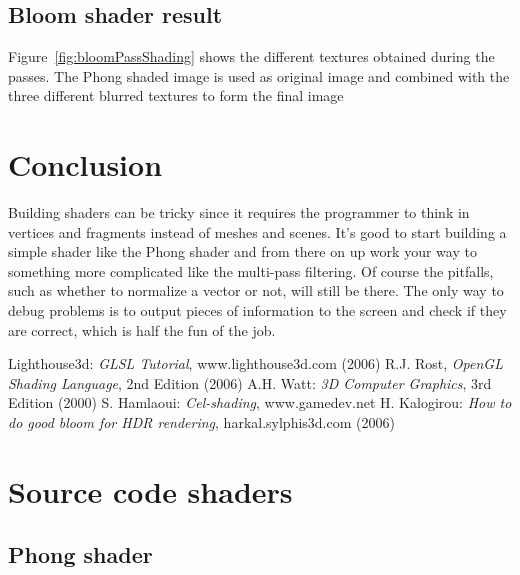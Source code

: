 \documentclass[a4paper,12pt]{article}
\begin{document}
\subsection{Bloom shader result}
\label{sec:bloomShaderResult}
Figure~\ref{fig:bloomPassShading} shows the different textures obtained during the passes. The Phong shaded image is used as original image and combined with the three different blurred textures to form the final image

\section{Conclusion}
\label{sec:Conclusion}
Building shaders can be tricky since it requires the programmer to think in vertices and fragments instead of meshes and scenes. It's good to start building a simple shader like the Phong shader and from there on up work your way to something more complicated like the multi-pass filtering. Of course the pitfalls, such as whether to normalize a vector or not, will still be there. The only way to debug problems is to output pieces of information to the screen and check if they are correct, which is half the fun of the job.

\begin{thebibliography}{99}
	 Lighthouse3d: \emph{GLSL Tutorial}, www.lighthouse3d.com (2006)
	 R.J. Rost, \emph{OpenGL Shading Language}, 2nd Edition (2006)
	 A.H. Watt: \emph{3D Computer Graphics}, 3rd Edition (2000)
	 S. Hamlaoui: \emph{Cel-shading}, www.gamedev.net
	 H. Kalogirou: \emph{How to do good bloom for HDR rendering}, harkal.sylphis3d.com (2006)
\end{thebibliography}

\pagebreak[4]

\appendix

\section{Source code shaders}
\label{sec:SourceCodeShaders}

\subsection{Phong shader}
\label{sec:PhongShaderSource}
\end{document}
